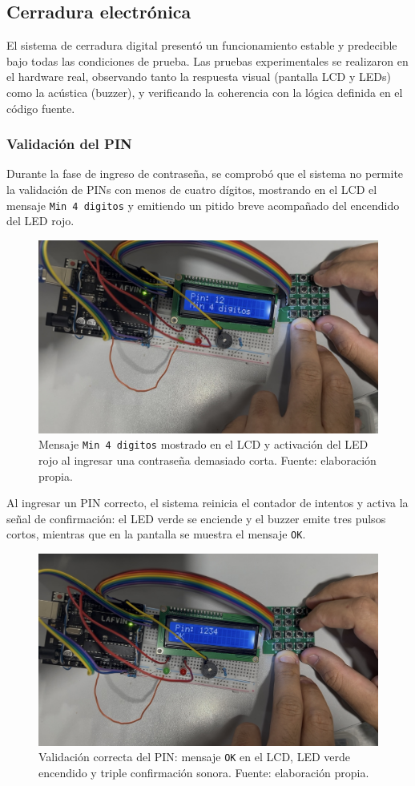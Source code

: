 \subsection{Cerradura electrónica}

El sistema de cerradura digital presentó un funcionamiento estable y predecible bajo todas las condiciones de prueba. 
Las pruebas experimentales se realizaron en el hardware real, observando tanto la respuesta visual (pantalla LCD y LEDs) 
como la acústica (buzzer), y verificando la coherencia con la lógica definida en el código fuente.

\subsubsection{Validación del PIN}

Durante la fase de ingreso de contraseña, se comprobó que el sistema no permite la validación de PINs con menos de cuatro dígitos, 
mostrando en el LCD el mensaje \texttt{Min 4 digitos} y emitiendo un pitido breve acompañado del encendido del LED rojo.  

\begin{figure}[H]
    \centering
    \includegraphics[width=0.7\columnwidth]{Anexos/Cerradura_Min4.png}
    \caption{Mensaje \texttt{Min 4 digitos} mostrado en el LCD y activación del LED rojo al ingresar una contraseña demasiado corta. Fuente: elaboración propia.}
    \label{fig:cerradura_min4}
\end{figure}

Al ingresar un PIN correcto, el sistema reinicia el contador de intentos y activa la señal de confirmación: 
el LED verde se enciende y el buzzer emite tres pulsos cortos, mientras que en la pantalla se muestra el mensaje \texttt{OK}.  

\begin{figure}[H]
    \centering
    \includegraphics[width=0.7\columnwidth]{Anexos/Cerradura_OK.png}
    \caption{Validación correcta del PIN: mensaje \texttt{OK} en el LCD, LED verde encendido y triple confirmación sonora. Fuente: elaboración propia.}
    \label{fig:cerradura_ok}
\end{figure}


